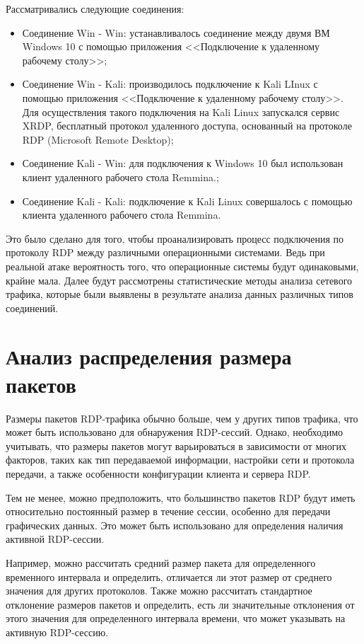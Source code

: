 \documentclass[bachelor, och, coursework]{SCWorks}
\begin{document}
Рассматривались следующие соединения:

\begin{itemize}
  \item Соединение Win - Win: устанавливалось соединение между двумя ВМ Windows 10 с помощью приложения
  <<Подключение к удаленному рабочему столу>>; 
  \item Соединение Win - Kali: производилось подключение к Kali LInux с помощью приложения <<Подключение к удаленному рабочему столу>>.
  Для осуществления такого подключения на Kali Linux запускался сервис XRDP, бесплатный протокол удаленного доступа, основанный на 
  протоколе RDP (Microsoft Remote Desktop);
  \item Соединение Kali - Win: для подключения к Windows 10 был использован клиент удаленного рабочего стола Remmina.;
  \item Соединение Kali - Kali: подключение к Kali Linux совершалось с помощью клиента удаленного рабочего стола Remmina.
\end{itemize}

Это было сделано для того, чтобы проанализировать процесс подключения по протоколу RDP между различными операционными системами. Ведь при 
реальной атаке вероятность того, что операционные системы будут одинаковыми, крайне мала. Далее будут рассмотрены статистические методы 
анализа сетевого трафика, которые были выявлены в результате анализа данных различных типов соединений.

\section{Анализ распределения размера пакетов}

Размеры пакетов RDP-трафика обычно больше, чем у других типов трафика, что может быть использовано для обнаружения RDP-сессий. 
Однако, необходимо учитывать, что размеры пакетов могут варьироваться в зависимости от многих 
факторов, таких как тип передаваемой информации, настройки сети и протокола передачи, а также 
особенности конфигурации клиента и сервера RDP.

Тем не менее, можно предположить, что большинство пакетов RDP будут иметь относительно постоянный размер в 
течение сессии, особенно для передачи графических данных. Это может быть использовано для определения наличия активной RDP-сессии.

Например, можно рассчитать средний размер пакета для определенного временного интервала и определить, отличается 
ли этот размер от среднего значения для других протоколов. Также можно рассчитать стандартное отклонение размеров 
пакетов и определить, есть ли значительные отклонения от этого значения для определенного интервала времени, что 
может указывать на активную RDP-сессию.
\end{document}
